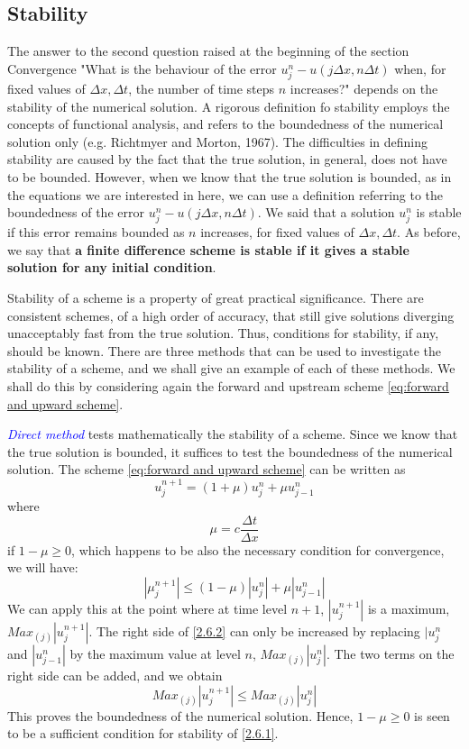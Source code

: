 \subsection{Stability}
The answer to the second question raised at the beginning of the section Convergence "What is the behaviour of the error $u_j^n-u(j\Delta x, n\Delta t)$ when, for fixed values of $\Delta x, \Delta t$, the number of time steps $n$ increases?" depends on the stability of the numerical solution. A rigorous definition fo stability employs the concepts of functional analysis, and refers to the boundedness of the numerical solution only (e.g. Richtmyer and Morton, 1967). The difficulties in defining stability are caused by the fact that the true solution, in general, does not have to be bounded. However, when we know that the true solution is bounded, as in the equations we are interested in here, we can use a definition referring to the boundedness of the error $u_j^n-u(j\Delta x, n\Delta t)$. We said that a solution $u_j^n$ is stable if this error remains bounded as $n$ increases, for fixed values of $\Delta x, \Delta t$. As before, we say that \textbf{a finite difference scheme is stable if it gives a stable solution for any initial condition}.

Stability of a scheme is a property of great practical significance. There are consistent schemes, of a high order of accuracy, that still give solutions diverging unacceptably fast from the true solution. Thus, conditions for stability, if any, should be known. There are three methods that can be used to investigate the stability of a scheme, and we shall give an example of each of these methods. We shall do this by considering again the forward and upstream scheme \ref{eq:forward and upward scheme}.


\textcolor{Blue}{\textit{Direct method}} tests mathematically the stability of a scheme. Since we know that the true solution is bounded, it suffices to test the boundedness of the numerical solution. The scheme \ref{eq:forward and upward scheme} can be written as 
\begin{equation}\label{2.6.1}
    u_j^{n+1}=(1+\mu)u_j^n+\mu u^n_{j-1}    
\end{equation}
where 
$$\mu=c\frac{\Delta t}{\Delta x}$$
if $1-\mu\geq 0$, which happens to be also the necessary condition for convergence, we will have:
\begin{equation}\label{2.6.2}
    |\mu_j^{n+1}|\leq(1-\mu)|u_j^n|+\mu|u^n_{j-1}|
\end{equation}
We can apply this at the point where at time level $n+1$, $|u_j^{n+1}|$ is a maximum, $Max_{(j)}|u_j^{n+1}|$. The right side of \ref{2.6.2} can only be increased by replacing $|u_j^n$ and $|u_{j-1}^n|$ by the maximum value at level $n$, $Max_{(j)}|u_j^n|$. The two terms on the right side can be added, and we obtain
$$Max_{(j)}|u_j^{n+1}|\leq Max_{(j)}|u_j^n|$$
This proves the boundedness of the numerical solution. Hence, $1-\mu\geq 0$ is seen to be a sufficient condition for stability of \ref{2.6.1}.

